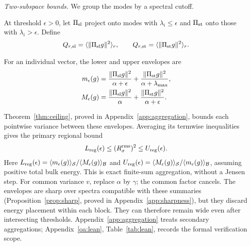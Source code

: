 \emph{Two-subspace bounds.} We group the modes by a spectral cutoff.
\begin{samepage}
\begin{definition}\label{def:split}
At threshold $\epsilon>0$, let $\Pi_{\rm sl}$ project onto modes with
$\lambda_i\le\epsilon$ and $\Pi_{\rm st}$ onto those with $\lambda_i>\epsilon$.
Define
\begin{equation*}
 Q_{r,\rm sl}=\langle\|\Pi_{\rm sl}g\|^2\rangle_r,
 \qquad Q_{r,\rm st}=\langle\|\Pi_{\rm st}g\|^2\rangle_r.
\end{equation*}
\end{definition}
\end{samepage}
For an individual vector, the lower and upper envelopes are
\begin{equation}\label{eq:variance-envelopes}
 \begin{aligned}
 m_\epsilon(g)&=\frac{\|\Pi_{\mathrm{sl}} g\|^2}{\alpha+\epsilon}
              +\frac{\|\Pi_{\mathrm{st}} g\|^2}{\alpha+\lambda_{\max}},\\
 M_\epsilon(g)&=\frac{\|\Pi_{\mathrm{sl}} g\|^2}{\alpha}
              +\frac{\|\Pi_{\mathrm{st}} g\|^2}{\alpha+\epsilon}.
 \end{aligned}
\end{equation}

Theorem~\ref{thm:ceiling}, proved in Appendix~\ref{app:aggregation}, bounds each
pointwise variance between these envelopes. Averaging its termwise inequalities
gives the primary regional bound
\begin{equation}\label{eq:regional-rms-sandwich}
 L_{\rm reg}(\epsilon)\le(R_{\sigma}^{\mathrm{rms}})^2\le U_{\rm reg}(\epsilon).
\end{equation}
Here $L_{\rm reg}(\epsilon)=\langle m_\epsilon(g)\rangle_{\mathcal S}/\langle M_\epsilon(g)\rangle_{\mathcal B}$
and $U_{\rm reg}(\epsilon)=\langle M_\epsilon(g)\rangle_{\mathcal S}/\langle m_\epsilon(g)\rangle_{\mathcal B}$,
assuming positive total bulk energy. This is exact
finite-sum aggregation, without a Jensen step. For common variance $v$, replace
$\alpha$ by $\gamma$; the common factor cancels. The envelopes are sharp over
spectra compatible with these summaries (Proposition~\ref{prop:sharp}, proved in
Appendix~\ref{app:sharpness}), but they discard energy placement within each block.
They can therefore remain wide even after intersecting thresholds.
Appendix~\ref{app:aggregation} treats secondary aggregations; Appendix~\ref{oa:lean},
Table~\ref{tab:lean}, records the formal verification scope.
